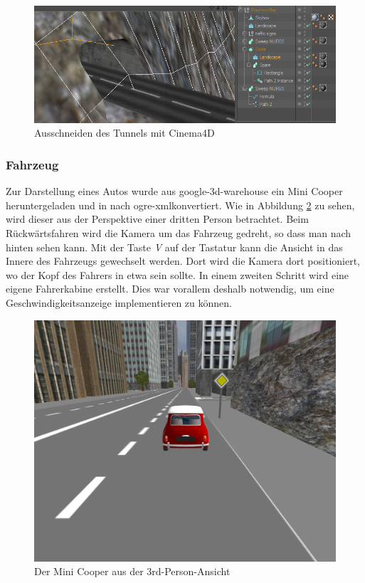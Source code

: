 \begin{figure}[H]
\centering
\includegraphics[width=1\linewidth]{src/screenshot_cinema4d.png}
\caption{Ausschneiden des Tunnels mit Cinema4D} %
\label{cinema4d_ausschneiden_tunnel} %
\end{figure}

\newpage
\subsubsection{Fahrzeug}
Zur Darstellung eines Autos wurde aus \gls{google-3d-warehouse} ein Mini Cooper heruntergeladen und in nach \gls{ogre-xml}konvertiert. Wie in Abbildung \ref{screenshot_minicooper} zu sehen, wird dieser aus der Perspektive einer dritten Person betrachtet. Beim Rückwärtsfahren wird die Kamera um das Fahrzeug gedreht, so dass man nach hinten sehen kann. Mit der Taste \textit{V} auf der Tastatur kann die Ansicht in das Innere des Fahrzeugs gewechselt werden. Dort wird die Kamera dort positioniert, wo der Kopf des Fahrers in etwa sein sollte. In einem zweiten Schritt wird eine eigene Fahrerkabine erstellt. Dies war vorallem deshalb notwendig, um eine Geschwindigkeitsanzeige implementieren zu können. 
\begin{figure}[H]
\centering 
\includegraphics[width=1\linewidth]{src/screenshot_minicooper.png}
\caption{Der Mini Cooper aus der 3rd-Person-Ansicht} %
\label{screenshot_minicooper} %
\end{figure}

